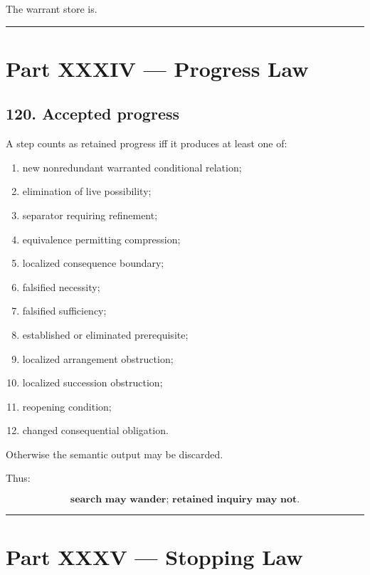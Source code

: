 \documentclass[
]{article}
\providecommand{\tightlist}{%
  \setlength{\itemsep}{0pt}\setlength{\parskip}{0pt}}
\begin{document}
The warrant store is.

\begin{center}\rule{0.5\linewidth}{0.5pt}\end{center}

\section{Part XXXIV --- Progress Law}\label{part-xxxiv-progress-law}

\subsection{120. Accepted progress}\label{accepted-progress}

A step counts as retained progress iff it produces at least one of:

\begin{enumerate}
\def\labelenumi{\arabic{enumi}.}
\tightlist
\item
  new nonredundant warranted conditional relation;
\item
  elimination of live possibility;
\item
  separator requiring refinement;
\item
  equivalence permitting compression;
\item
  localized consequence boundary;
\item
  falsified necessity;
\item
  falsified sufficiency;
\item
  established or eliminated prerequisite;
\item
  localized arrangement obstruction;
\item
  localized succession obstruction;
\item
  reopening condition;
\item
  changed consequential obligation.
\end{enumerate}

Otherwise the semantic output may be discarded.

Thus:

\[
\boxed{
\textbf{search may wander;
retained inquiry may not.}
}
\]

\begin{center}\rule{0.5\linewidth}{0.5pt}\end{center}

\section{Part XXXV --- Stopping Law}\label{part-xxxv-stopping-law}
\end{document}
